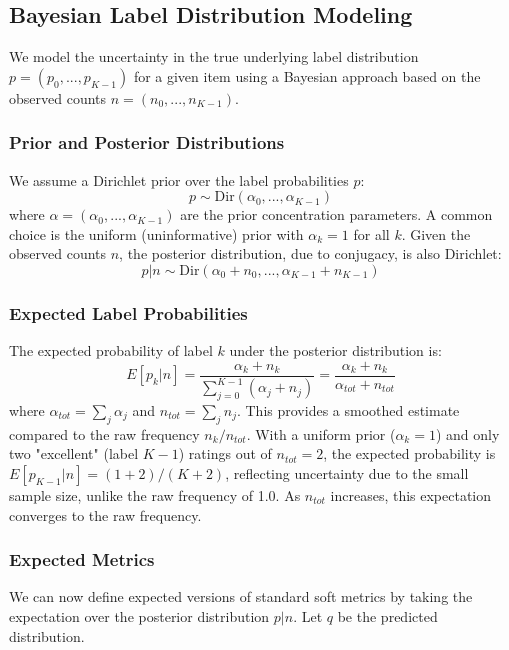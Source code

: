 \documentclass[journal]{IEEEtran}
\begin{document}
\subsection{Bayesian Label Distribution Modeling}
We model the uncertainty in the true underlying label distribution $p = (p_0, ..., p_{K-1})$ for a given item using a Bayesian approach based on the observed counts $n = (n_0, ..., n_{K-1})$.

\subsubsection{Prior and Posterior Distributions}
We assume a Dirichlet prior over the label probabilities $p$:
\begin{equation}
p \sim \text{Dir}(\alpha_0, ..., \alpha_{K-1})
\end{equation}
where $\alpha = (\alpha_0, ..., \alpha_{K-1})$ are the prior concentration parameters. A common choice is the uniform (uninformative) prior with $\alpha_k = 1$ for all $k$. Given the observed counts $n$, the posterior distribution, due to conjugacy, is also Dirichlet:
\begin{equation}
p|n \sim \text{Dir}(\alpha_0 + n_0, ..., \alpha_{K-1} + n_{K-1})
\end{equation}

\subsubsection{Expected Label Probabilities}
The expected probability of label $k$ under the posterior distribution is:
\begin{equation}
E[p_k|n] = \frac{\alpha_k + n_k}{\sum_{j=0}^{K-1} (\alpha_j + n_j)} = \frac{\alpha_k + n_k}{\alpha_{tot} + n_{tot}}
\end{equation}
where $\alpha_{tot} = \sum_j \alpha_j$ and $n_{tot} = \sum_j n_j$. This provides a smoothed estimate compared to the raw frequency $n_k / n_{tot}$. With a uniform prior ($\alpha_k = 1$) and only two "excellent" (label $K-1$) ratings out of $n_{tot}=2$, the expected probability is $E[p_{K-1}|n] = (1 + 2) / (K + 2)$, reflecting uncertainty due to the small sample size, unlike the raw frequency of 1.0. As $n_{tot}$ increases, this expectation converges to the raw frequency.

\subsubsection{Expected Metrics}
We can now define expected versions of standard soft metrics by taking the expectation over the posterior distribution $p|n$. Let $q$ be the predicted distribution.
\end{document}
